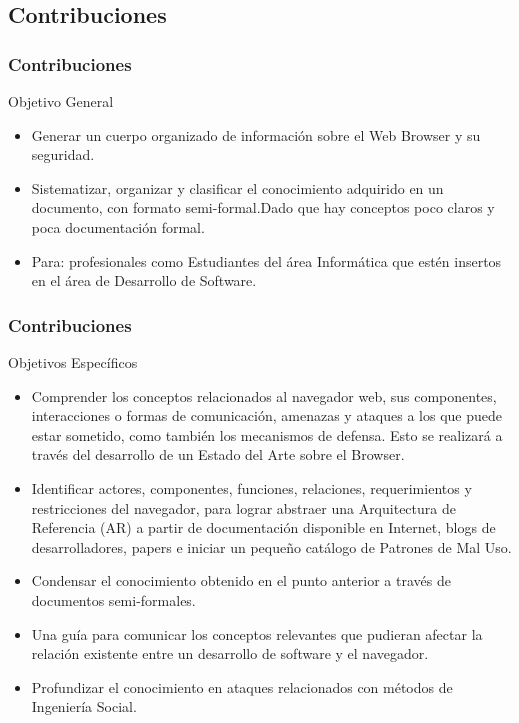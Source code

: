 \documentclass[serif,9pt]{beamer}
\begin{document}
\subsection{Contribuciones}
\begin{frame}
	\frametitle{Contribuciones}
	\begin{block}{Objetivo General}
		\begin{itemize}
			\item Generar un cuerpo organizado de informaci\'on sobre el Web Browser y su seguridad.
			\item Sistematizar, organizar y clasificar el conocimiento adquirido en un documento, con formato semi-formal.Dado que hay conceptos poco claros y poca documentación formal.
			\item Para: profesionales como Estudiantes del \'area Inform\'atica que est\'en insertos en el \'area de Desarrollo de Software.
		\end{itemize}
	\end{block}
\end{frame}

\begin{frame}
	\frametitle{Contribuciones}
	\begin{block}{Objetivos Espec\'ificos}
		\begin{itemize}
			\item Comprender los conceptos relacionados al navegador web, sus componentes, interacciones o formas de comunicaci\'on, amenazas y ataques a los que puede estar sometido, como tambi\'en los mecanismos de defensa. Esto se realizar\'a a trav\'es del desarrollo de un Estado del Arte sobre el Browser.
			\item Identificar actores, componentes, funciones, relaciones, requerimientos y restricciones del navegador, para lograr abstraer una Arquitectura de Referencia (AR) a partir de documentaci\'on disponible en Internet, blogs de desarrolladores, papers e iniciar un pequeño cat\'alogo de Patrones de Mal Uso. 
			\item Condensar el conocimiento obtenido en el punto anterior a trav\'es de documentos semi-formales.
			\item Una gu\'ia para comunicar los conceptos relevantes que pudieran afectar la relaci\'on existente entre un desarrollo de software y el navegador.
			\item Profundizar el conocimiento en ataques relacionados con m\'etodos de Ingenier\'ia Social.
		\end{itemize}
	\end{block}
\end{frame}
\end{document}
